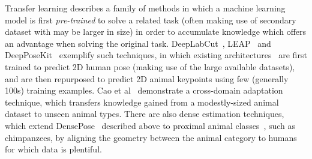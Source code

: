 Transfer learning describes a family of methods in which a machine learning model is first \emph{pre-trained} to solve a related task (often making use of secondary dataset with may be larger in size) in order to accumulate knowledge which offers an advantage when solving the original task. DeepLabCut~\cite{mathis2018deeplabcut}, LEAP~\cite{leap-animal-pose} and DeepPoseKit~\cite{graving2019deepposekit} exemplify such techniques, in which existing architectures~\cite{pishchulin2016deepcut,newell2016stacked,densenet,mobilenetv2} are first trained to predict 2D human pose (making use of the large available datasets), and are then repurposed to predict 2D animal keypoints using few (generally 100s) training examples. Cao et al~\cite{animalpose} demonstrate a cross-domain adaptation technique, which transfers knowledge gained from a modestly-sized animal dataset to unseen animal types. There are also dense estimation techniques, which extend DensePose~\cite{guler2018densepose} described above to proximal animal classes~\cite{DenseposeEvo20}, such as chimpanzees, by aligning the geometry between the animal category to humans for which data is plentiful.






